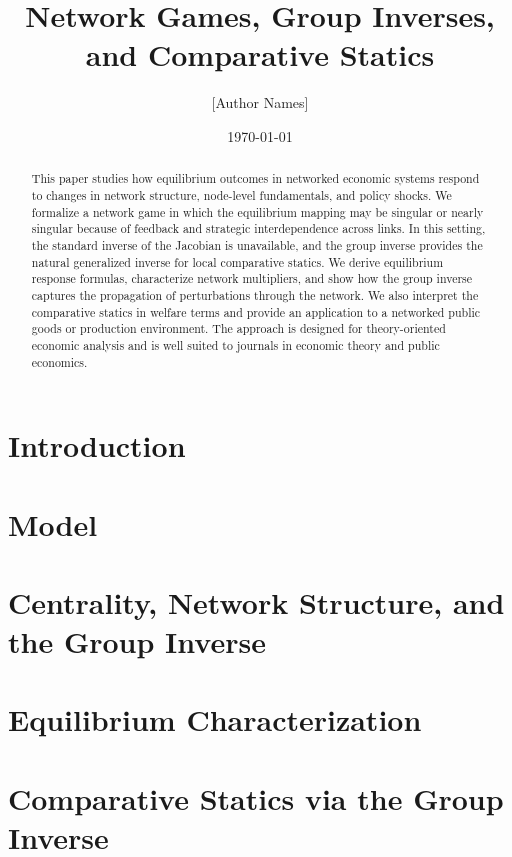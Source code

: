 \documentclass[11pt]{article}
\title{Network Games, Group Inverses, and Comparative Statics}
\author{[Author Names]}
\date{\today}
\begin{document}
\maketitle

\begin{abstract}
This paper studies how equilibrium outcomes in networked economic systems respond to changes in network structure, node-level fundamentals, and policy shocks. We formalize a network game in which the equilibrium mapping may be singular or nearly singular because of feedback and strategic interdependence across links. In this setting, the standard inverse of the Jacobian is unavailable, and the group inverse provides the natural generalized inverse for local comparative statics. We derive equilibrium response formulas, characterize network multipliers, and show how the group inverse captures the propagation of perturbations through the network. We also interpret the comparative statics in welfare terms and provide an application to a networked public goods or production environment. The approach is designed for theory-oriented economic analysis and is well suited to journals in economic theory and public economics.
\end{abstract}

\section{Introduction}



\section{Model}



\section{Centrality, Network Structure, and the Group Inverse}



\section{Equilibrium Characterization}



\section{Comparative Statics via the Group Inverse}
\end{document}
